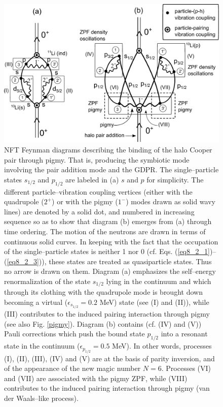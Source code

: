 \begin{subappendices}
   \begin{figure}
   \centerline{\includegraphics*[width=17cm,angle=0]{nutshell/figs/VdW.pdf}}\caption{NFT Feynman diagrams describing the binding of the halo Cooper pair through pigmy. That is, producing the symbiotic mode involving the pair addition mode and the GDPR. The single--particle states $s_{1/2}$ and $p_{1/2}$ are labeled in (a) $s$ and $p$ for simplicity. The different particle--vibration coupling vertices (either with the quadrupole ($2^+$) or with the pigmy ($1^-$) modes drawn as solid wavy lines) are denoted by a solid dot, and numbered in increasing sequence so as to show that diagram (b) emerges from (a) through time ordering. The motion of the neutrons are drawn in terms of continuous solid curves. In keeping with the fact that the occupation of the single--particle states is neither 1 nor 0 (cf. Eqs. (\ref{eq8_2_1})--(\ref{eq8_2_3})), these states are treated as quasiparticle states. Thus no arrow is drawn on them. Diagram (a) emphasizes the self--energy renormalization of the state $s_{1/2}$ lying in the continuum and which   through its clothing with the quadrupole mode is brought down becoming a virtual ($\epsilon_{s_{1/2}}=0.2$ MeV) state (see (I) and (II)), while (III) contributes to the induced pairing interaction through pigmy (see also Fig. \ref{pigmy}). Diagram (b) contains (cf. (IV) and (V)) Pauli corrections which push the bound state $p_{1/2}$ into a resonant state in the continuum ($\epsilon_{p_{1/2}}=0.5$ MeV). In other words, processes (I), (II), (III), (IV) and (V) are at the basis of parity inversion, and of the appearance of the new magic number $N=6$. Processes (VI) and (VII) are associated with the pigmy ZPF, while (VIII) contributes to the induced pairing interaction through pigmy (van der Waals--like process).}\label{fig2.A.1}
   \end{figure}
 

\end{subappendices}
